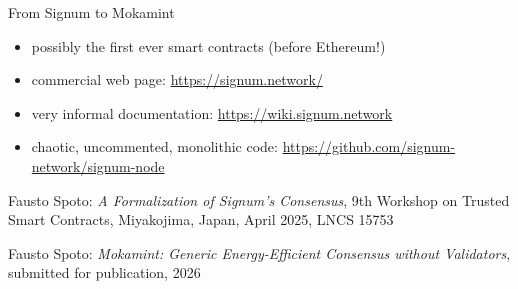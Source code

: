 \documentclass[11pt]{beamer}  %
\begin{document}
\begin{frame}{From Signum to Mokamint}

  \begin{itemize}
  \item possibly the first ever smart contracts (before Ethereum!)
  \item commercial web page: \url{https://signum.network/}
  \item very informal documentation: \url{https://wiki.signum.network}
  \item chaotic, uncommented, monolithic code:
    \url{https://github.com/signum-network/signum-node}
  \end{itemize}

  \bigskip

  \begin{greenbox}{}
    Fausto Spoto: \emph{A Formalization of Signum's Consensus},
    9th Workshop on Trusted Smart Contracts, Miyakojima, Japan, April 2025, LNCS 15753

    \medskip

    Fausto Spoto: \emph{\alert{Mokamint}: Generic Energy-Efficient Consensus without Validators},
    submitted for publication, 2026
  \end{greenbox}

\end{frame}
\end{document}
